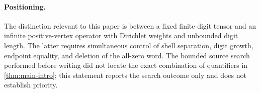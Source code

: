 \paragraph{Positioning.}
The distinction relevant to this paper is between a fixed finite digit
tensor and an infinite positive-vertex operator with Dirichlet weights and
unbounded digit length.  The latter requires simultaneous control of shell
separation, digit growth, endpoint equality, and deletion of the all-zero
word.  The bounded source search performed before writing did not locate
the exact combination of quantifiers in \cref{thm:main-intro}; this
statement reports the search outcome only and does not establish priority.
